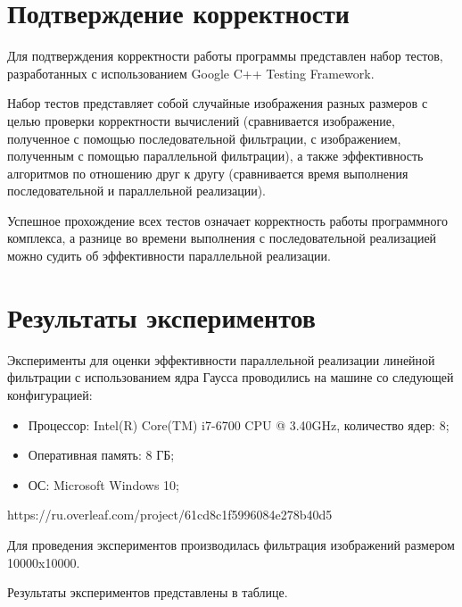 \documentclass{report}
\begin{document}
\section*{Подтверждение корректности}
Для подтверждения корректности работы программы представлен набор тестов, разработанных с использованием Google C++ Testing Framework.
\par Набор тестов представляет собой случайные изображения разных размеров с целью проверки корректности вычислений (сравнивается изображение, полученное с помощью последовательной фильтрации, с изображением, полученным с помощью параллельной фильтрации), а также эффективность алгоритмов по отношению друг к другу (сравнивается время выполнения последовательной и параллельной реализации).
\par Успешное прохождение всех тестов означает корректность работы программного комплекса, а разнице во времени выполнения с последовательной реализацией можно судить об эффективности параллельной реализации.
\newpage

\section*{Результаты экспериментов}
Эксперименты для оценки эффективности параллельной реализации линейной фильтрации с использованием ядра Гаусса проводились на машине со следующей конфигурацией:

\begin{itemize}
\item Процессор: Intel(R) Core(TM) i7-6700 CPU @ 3.40GHz, количество ядер: 8;
\item Оперативная память: 8 ГБ;
\item ОС: Microsoft Windows 10;
\end{itemize}
https://ru.overleaf.com/project/61cd8c1f5996084e278b40d5
\par Для проведения экспериментов производилась фильтрация изображений размером 10000x10000. 
\par Результаты экспериментов представлены в таблице.
\end{document}
